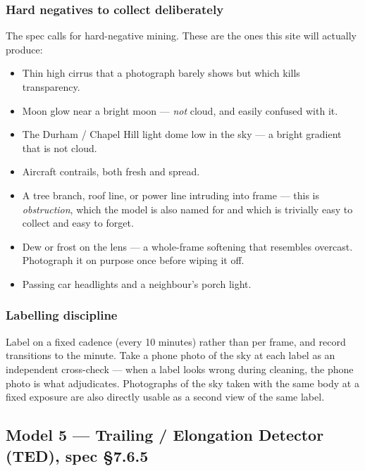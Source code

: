 \documentclass[11pt]{article}
\begin{document}
\subsubsection*{Hard negatives to collect deliberately}

The spec calls for hard-negative mining. These are the ones this site will
actually produce:

\begin{itemize}
\item Thin high cirrus that a photograph barely shows but which kills
      transparency.
\item Moon glow near a bright moon --- \emph{not} cloud, and easily confused
      with it.
\item The Durham / Chapel Hill light dome low in the sky --- a bright gradient
      that is not cloud.
\item Aircraft contrails, both fresh and spread.
\item A tree branch, roof line, or power line intruding into frame --- this is
      \emph{obstruction}, which the model is also named for and which is
      trivially easy to collect and easy to forget.
\item Dew or frost on the lens --- a whole-frame softening that resembles
      overcast. Photograph it on purpose once before wiping it off.
\item Passing car headlights and a neighbour's porch light.
\end{itemize}

\subsubsection*{Labelling discipline}

Label on a fixed cadence (every 10 minutes) rather than per frame, and record
transitions to the minute. Take a phone photo of the sky at each label as an
independent cross-check --- when a label looks wrong during cleaning, the phone
photo is what adjudicates. Photographs of the sky taken with the same body at a
fixed exposure are also directly usable as a second view of the same label.

\subsection{Model 5 --- Trailing / Elongation Detector (TED), spec \S7.6.5}\label{m:ted}
\end{document}
